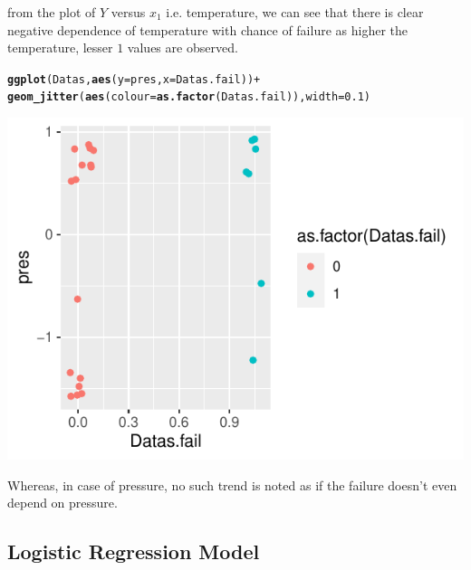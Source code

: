 \documentclass[11pt,english]{article}\usepackage[]{graphicx}\usepackage[]{xcolor}
\makeatletter
\def\maxwidth{ %
  \ifdim\Gin@nat@width>\linewidth
    \linewidth
  \else
    \Gin@nat@width
  \fi
}
\newcommand{\hlnum}[1]{\textcolor[rgb]{0.686,0.059,0.569}{#1}}%
\newcommand{\hlopt}[1]{\textcolor[rgb]{0,0,0}{#1}}%
\newcommand{\hlstd}[1]{\textcolor[rgb]{0.345,0.345,0.345}{#1}}%
\newcommand{\hlkwc}[1]{\textcolor[rgb]{0.333,0.667,0.333}{#1}}%
\newcommand{\hlkwd}[1]{\textcolor[rgb]{0.737,0.353,0.396}{\textbf{#1}}}%
\newenvironment{kframe}{%
 \def\at@end@of@kframe{}%
 \ifinner\ifhmode%
  \def\at@end@of@kframe{\end{minipage}}%
  \begin{minipage}{\columnwidth}%
 \fi\fi%
 \def\FrameCommand##1{\hskip\@totalleftmargin \hskip-\fboxsep
 \colorbox{shadecolor}{##1}\hskip-\fboxsep
     \hskip-\linewidth \hskip-\@totalleftmargin \hskip\columnwidth}%
 \MakeFramed {\advance\hsize-\width
   \@totalleftmargin\z@ \linewidth\hsize
   \@setminipage}}%
 {\par\unskip\endMakeFramed%
 \at@end@of@kframe}
\newenvironment{knitrout}{}{} %
\makeatother
\begin{document}
from the plot of $Y$ versus $x_{1}$ i.e. temperature, we can see
that there is clear negative dependence of temperature with chance
of failure as higher the temperature, lesser $1$ values are observed.
\begin{center}
\begin{knitrout}
\color{fgcolor}\begin{kframe}
\begin{alltt}
\hlkwd{ggplot}\hlstd{(Datas,} \hlkwd{aes}\hlstd{(}\hlkwc{y}\hlstd{=pres,} \hlkwc{x}\hlstd{=Datas.fail))} \hlopt{+}
\hlkwd{geom_jitter}\hlstd{(}\hlkwd{aes}\hlstd{(}\hlkwc{colour}\hlstd{=}\hlkwd{as.factor}\hlstd{(Datas.fail)),}\hlkwc{width} \hlstd{=} \hlnum{0.1}\hlstd{)}
\end{alltt}
\end{kframe}
\includegraphics[width=\maxwidth]{figure/unnamed-chunk-2-1} 
\end{knitrout}
\par\end{center}

Whereas, in case of pressure, no such trend is noted as if the failure
doesn't even depend on pressure.
\author{\pagebreak}

\subsection*{Logistic Regression Model}
\end{document}
